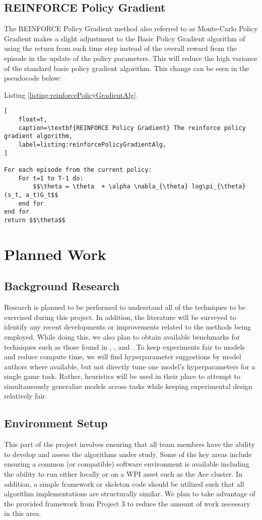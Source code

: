 \documentclass[conference]{IEEEtran}
\begin{document}
\subsection{REINFORCE Policy Gradient}
The REINFORCE Policy Gradient method also referred to as Monte-Carlo Policy Gradient makes a slight adjustment to the Basic Policy Gradient algorithm of using the return from each time step instead of the overall reward from the episode in the update of the policy parameters. This will reduce the high variance of the standard basic policy gradient algorithm.
This change can be seen in the pseudocode below:

Listing \ref{listing:reinforcePolicyGradientAlg}.

\begin{lstlisting}[
    float=t,
    caption=\textbf{REINFORCE Policy Gradient} The reinforce policy gradient algorithm,
    label=listing:reinforcePolicyGradientAlg,
]

For each episode from the current policy:
    For t=1 to T-1 do:
        $$\theta = \theta  + \alpha \nabla_{\theta} log\pi_{\theta}(s_t, a_t)G_t$$
    end for
end for
return $$\theta$$
\end{lstlisting}

\section{Planned Work} \label{planned}

\subsection{Background Research}
Research is planned to be performed to understand all of the techniques to be exercised during this project.
In addition, the literature will be surveyed to identify any recent developments or improvements related to the methods being employed.
While doing this, we also plan to obtain available benchmarks for techniques such as those found in \cite{DQNOriginalPaper}, \cite{NatureDeepLearning}, and \cite{bhonker2017playing}.
To keep experiments fair to models and reduce compute time, we will find hyperparameter suggestions by model authors where available, but not directly tune one model's hyperparameters for a single game task. Rather, heuristics will be used in their place to attempt to simultaneously generalize models across tasks while keeping experimental design relatively fair.

\subsection{Environment Setup}
This part of the project involves ensuring that all team members have the ability to develop and assess the algorithms under study.
Some of the key areas include ensuring a common (or compatible) software environment is available including the ability to run \cite{nichol2018retro} either locally or on a WPI asset such as the Ace cluster.
In addition, a simple framework or skeleton code should be utilized such that all algorithm implementations are structurally similar.
We plan to take advantage of the provided framework from Project 3 to reduce the amount of work necessary in this area.
\end{document}
